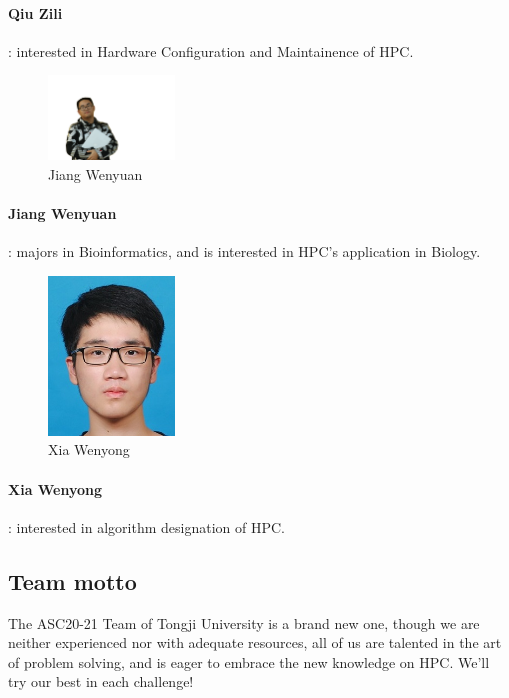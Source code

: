 \documentclass[a4paper, 11pt]{article}
\begin{document}
			\paragraph{Qiu Zili}: interested in Hardware Configuration and Maintainence of HPC.
			
			
			\begin{figure}[H]
				\centering
				\includegraphics[width=0.3\textwidth]{Jiang.png}
				\caption{Jiang Wenyuan} 
				\label{photo:4}  
			\end{figure} 
			\paragraph{Jiang Wenyuan}: majors in Bioinformatics, and is interested in HPC's application in Biology.
			
			
			\begin{figure}[H]
				\centering
				\includegraphics[width=0.3\textwidth]{Xia.jpg}
				\caption{Xia Wenyong} 
				\label{photo:5}  
			\end{figure} 
			\paragraph{Xia Wenyong}: interested in algorithm designation of HPC.
			
		\subsection{Team motto} 
		
			The ASC20-21 Team of Tongji University is a brand new one, though we are neither experienced nor with adequate resources, all of us are talented in the art of problem solving, and is eager to embrace the new knowledge on HPC. We'll try our best in each challenge!
		
\end{document}
